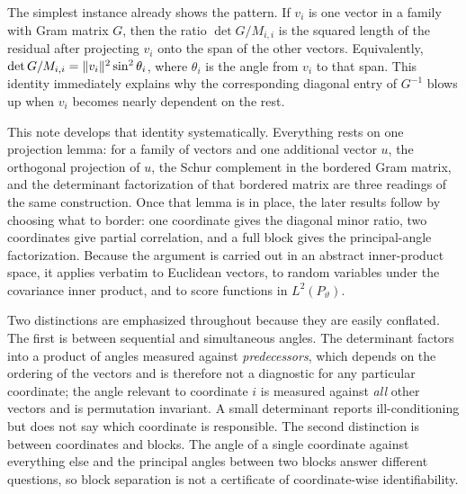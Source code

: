 \documentclass{IEEEtran}
\begin{document}
The simplest instance already shows the pattern. If $v_{i}$ is one vector in a family with Gram matrix $G$, then the ratio $\det G / M_{i,i}$ is the squared length of the residual after projecting $v_{i}$ onto the span of the other vectors. Equivalently, $\det G / M_{i,i} = \lVert v_{i}\rVert^{2}\sin^{2}\theta_{i}$, where $\theta_{i}$ is the angle from $v_{i}$ to that span. This identity immediately explains why the corresponding diagonal entry of $G^{-1}$ blows up when $v_{i}$ becomes nearly dependent on the rest.

This note develops that identity systematically. Everything rests on one projection lemma: for a family of vectors and one additional vector $u$, the orthogonal projection of $u$, the Schur complement in the bordered Gram matrix, and the determinant factorization of that bordered matrix are three readings of the same construction. Once that lemma is in place, the later results follow by choosing what to border: one coordinate gives the diagonal minor ratio, two coordinates give partial correlation, and a full block gives the principal-angle factorization. Because the argument is carried out in an abstract inner-product space, it applies verbatim to Euclidean vectors, to random variables under the covariance inner product, and to score functions in $L^{2}(P_{\vartheta})$.

Two distinctions are emphasized throughout because they are easily conflated. The first is between sequential and simultaneous angles. The determinant factors into a product of angles measured against \emph{predecessors}, which depends on the ordering of the vectors and is therefore not a diagnostic for any particular coordinate; the angle relevant to coordinate $i$ is measured against \emph{all} other vectors and is permutation invariant. A small determinant reports ill-conditioning but does not say which coordinate is responsible. The second distinction is between coordinates and blocks. The angle of a single coordinate against everything else and the principal angles between two blocks answer different questions, so block separation is not a certificate of coordinate-wise identifiability.
\end{document}
